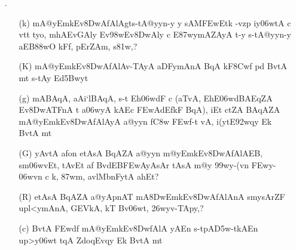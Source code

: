 \begin{itemize}
\begin{itemize}
               \end{itemize}

\item[{\dn \dnnum \rn{13}}.] \begin{itemize}
            
            \item[({\dn k})] {\dn mA@yEmkEv\38DwAfAlAgts\2-tA@yyn-y y sAM\3FEw\-Etk\2 -vzp iy\306wtA c vt\?{\qvb}t\?{\rs ,\re} tyo, mhAEvGAly\? Ev\398w\-Ev\38DwAly\? c E\387wymAZAyA\2\- t-y s\2-tA@yyn-y aEB\388wO kFf, pErZAm, s\2\381w,{\rs ?\re}}

            \item[({\dn K})] {\dn mA@yEmkEv\38DwAfAlAv-TAyA aDFymAnA BqA kF\38Cwf\2 pd\2 BvtA\2 mt\? s\2-tAy Ed\35Bwy\?t }
            
            \item[({\dn g})] {\dn mABAqA{\rs ,\re} aAi`lBAqA{\rs ,\re} s\2-t Eh\306wdF c {\rs (\re}aTvA{\rs ,\re} EhE\306wdBAEqZA\2 Ev\38DwATF{\qvb}nA\2 t\? a\306wyA kAEc \3FEwAd\?EfkF BqA{\rs ),\re} iEt ctZA\2 BAqAZA\2  mA@yEmkEv\38DwAfAlAyA a@yyn\2 f\3C8w\2 \3FEwf-t\2 vA{\rs ,\re} i(y\?tE\392wqy\? Ek\2 BvtA\2 mt}
            
            \item[({\dn G})] {\dn yAvtA\2 a\2fon etAsA\2 BqAZA a@yyn\2 m@yEmk\-Ev\38DwAfAlAEB, sm\306wv\?Et{\rs ,\re} tAvEt a\2f\? BvdEB\3FEwAyA\-sAr\2 tAsA\2 m@y\? \399w\?y-(v\?n \3FEw\?y-\306wv\?n c k, \387wm, avlMbnFytA ah\0Et{\rs ?\re}} 
            
            \item[({\dn R})] {\dn etAsA\2 BqAZA a@yApnAT{\rdt} mA\38DwEmkEv\38DwAfAlAnA\2 smysArZF upl<ymAnA, GEVkA, kT\2 Bv\306wt, \326wyv-TApy\?,{\rs ?\re}}
            
            \item[({\dn c})] {\dn BvtA\2 \3FEwd\?f\? mA@yEmkEv\38DwfAlA yAEn s\2-tpA\3D5w\--tkAEn up>y\306wt\?{\rs ,\re} t\?qA\2 ZdoqEvqy\? Ek\2 BvtA\2 mt}
            \end{itemize}
\end{itemize}

\newpage

